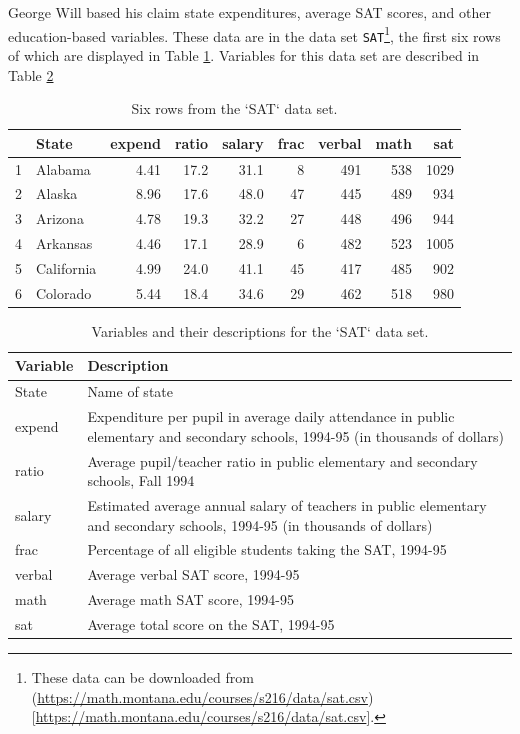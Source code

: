 \documentclass[
  10pt,
  openany]{book}
\theoremstyle{definition}
\theoremstyle{definition}
\theoremstyle{definition}
\theoremstyle{definition}
\theoremstyle{remark}
\begin{document}
George Will based his claim state expenditures, average SAT scores, and other education-based variables. These data are in the data set \texttt{SAT}\footnote{These data can be downloaded from (\url{https://math.montana.edu/courses/s216/data/sat.csv}){[}\url{https://math.montana.edu/courses/s216/data/sat.csv}{]}.}, the first six rows of which are displayed in Table \ref{tab:SATDF}. Variables for this data set are described in Table \ref{tab:SATVariables}

\begin{table}

\caption{\label{tab:SATDF}Six rows from the `SAT` data set.}
\centering
\begin{tabular}[t]{l|l|r|r|r|r|r|r|r}
\hline
  & State & expend & ratio & salary & frac & verbal & math & sat\\
\hline
1 & Alabama & 4.41 & 17.2 & 31.1 & 8 & 491 & 538 & 1029\\
\hline
2 & Alaska & 8.96 & 17.6 & 48.0 & 47 & 445 & 489 & 934\\
\hline
3 & Arizona & 4.78 & 19.3 & 32.2 & 27 & 448 & 496 & 944\\
\hline
4 & Arkansas & 4.46 & 17.1 & 28.9 & 6 & 482 & 523 & 1005\\
\hline
5 & California & 4.99 & 24.0 & 41.1 & 45 & 417 & 485 & 902\\
\hline
6 & Colorado & 5.44 & 18.4 & 34.6 & 29 & 462 & 518 & 980\\
\hline
\end{tabular}
\end{table}

\begin{table}

\caption{\label{tab:SATVariables}Variables and their descriptions for the `SAT` data set.}
\centering
\begin{tabular}[t]{l|l}
\hline
Variable & Description\\
\hline
State & Name of state\\
\hline
expend & Expenditure per pupil in average daily attendance in public elementary and secondary schools, 1994-95 (in thousands of dollars)\\
\hline
ratio & Average pupil/teacher ratio in public elementary and secondary schools, Fall 1994\\
\hline
salary & Estimated average annual salary of teachers in public elementary and secondary schools, 1994-95 (in thousands of dollars)\\
\hline
frac & Percentage of all eligible students taking the SAT, 1994-95\\
\hline
verbal & Average verbal SAT score, 1994-95\\
\hline
math & Average math SAT score, 1994-95\\
\hline
sat & Average total score on the SAT, 1994-95\\
\hline
\end{tabular}
\end{table}
\end{document}
